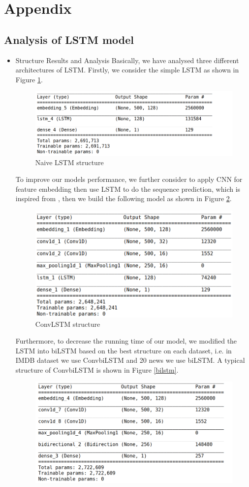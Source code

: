 \documentclass[11pt]{scrartcl}
\begin{document}

\section{Appendix}
\subsection{Analysis of LSTM model}
\begin{itemize}
	\item Structure Results and Analysis
	Basically, we have analysed three different architectures of LSTM. Firstly, we consider the simple LSTM as shown in Figure \ref{LSTM}.
	\begin{figure}[H]
	\centering
	\includegraphics[width=0.9 \linewidth]{fig/lstm.png}
	\caption{Naive LSTM structure}
	\label{LSTM}
\end{figure}
	To improve our models performance, we further consider to apply CNN for feature embedding then use LSTM to do the sequence prediction, which is inspired from \cite{LSTM+CNN}, then we build the following model as shown in Figure \ref{ConvLSTM}.
	\begin{figure}[H]
	\centering
	\includegraphics[width=0.6\linewidth]{fig/convlstm.png}
	\caption{ConvLSTM structure}
	\label{ConvLSTM}
\end{figure}
	Furthermore, to decrease the running time of our model, we modified the LSTM into biLSTM based on the best structure on each dataset, i.e. in IMDB dataset we use ConvbiLSTM and 20 news we use biLSTM. A typical structure of ConvbiLSTM is shown in Figure \ref{bilstm}.
	\begin{figure}[H]
	\centering
	\includegraphics[width=0.7\linewidth]{fig/bilstm.png}

\end{figure}
\end{itemize}
\end{document}

